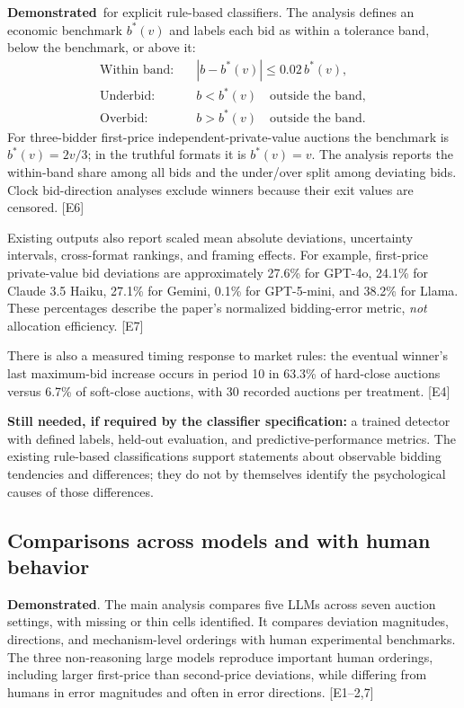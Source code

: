 \documentclass[11pt,letterpaper]{article}
\newcommand{\yes}{\textcolor{supported}{\textbf{Demonstrated}}}
\newcommand{\evidence}[1]{\textnormal{[E#1]}}
\begin{document}
\yes\ for explicit rule-based classifiers. The analysis defines an economic
benchmark $b^*(v)$ and labels each bid as within a tolerance band, below the
benchmark, or above it:
\[
\begin{aligned}
\text{Within band:}\quad & |b-b^*(v)|\leq 0.02\,b^*(v),\\
\text{Underbid:}\quad & b<b^*(v)\quad\text{outside the band},\\
\text{Overbid:}\quad & b>b^*(v)\quad\text{outside the band}.
\end{aligned}
\]
For three-bidder first-price independent-private-value auctions the benchmark
is $b^*(v)=2v/3$; in the truthful formats it is $b^*(v)=v$.
The analysis reports the within-band share among all bids and the under/over
split among deviating bids. Clock bid-direction analyses exclude winners
because their exit values are censored. \evidence{6}

Existing outputs also report scaled mean absolute deviations, uncertainty
intervals, cross-format rankings, and framing effects. For example, first-price
private-value bid deviations are approximately 27.6\% for GPT-4o, 24.1\% for
Claude 3.5 Haiku, 27.1\% for Gemini, 0.1\% for GPT-5-mini, and 38.2\% for
Llama. These percentages describe the paper's normalized bidding-error metric,
\emph{not} allocation efficiency. \evidence{7}

There is also a measured timing response to market rules: the eventual
winner's last maximum-bid increase occurs in period 10 in 63.3\% of hard-close
auctions versus 6.7\% of soft-close auctions, with 30 recorded auctions per
treatment. \evidence{4}

\textbf{Still needed, if required by the classifier specification:} a trained
detector with defined labels, held-out evaluation, and predictive-performance
metrics. The existing rule-based classifications support statements about
observable bidding tendencies and differences; they do not by themselves
identify the psychological causes of those differences.

\subsection{Comparisons across models and with human behavior}

\yes. The main analysis compares five LLMs across seven auction settings,
with missing or thin cells identified. It compares deviation magnitudes,
directions, and mechanism-level orderings with human experimental benchmarks.
The three non-reasoning large models reproduce important human orderings,
including larger first-price than second-price deviations, while differing
from humans in error magnitudes and often in error directions.
\evidence{1--2,7}
\end{document}
